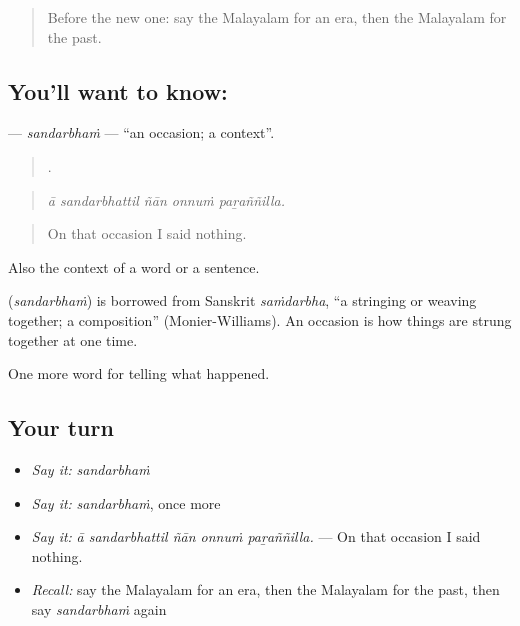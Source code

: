 \label{lesson:ML-C361-sandarbham}



\begin{quote}
Before the new one: say the Malayalam for an era, then the Malayalam for the past.
\end{quote}

\subsection*{You'll want to know: }
\textbf{} — \emph{sandarbhaṁ} — \textquotedblleft{}an occasion; a context\textquotedblright{}.

\begin{quote}
    .
\end{quote}

\begin{quote}
\emph{ā sandarbhattil ñān onnuṁ paṟaññilla.}
\end{quote}

\begin{quote}
On that occasion I said nothing.
\end{quote}

Also the context of a word or a sentence.

\begin{cousinweb}
\textbf{} (\emph{sandarbhaṁ}) is borrowed from Sanskrit \emph{saṁdarbha}, \textquotedblleft{}a stringing or weaving together; a composition\textquotedblright{} (Monier-Williams). An occasion is how things are strung together at one time.
\end{cousinweb}

\begin{grammarlens}[title={What you've built}]
One more word for telling what happened.
\end{grammarlens}

\subsection*{Your turn}
\begin{itemize}
\raggedright
  \item \emph{Say it:} \emph{sandarbhaṁ}
  \item \emph{Say it:} \emph{sandarbhaṁ}, once more
  \item \emph{Say it:} \emph{ā sandarbhattil ñān onnuṁ paṟaññilla.} — On that occasion I said nothing.
  \item \emph{Recall:} say the Malayalam for an era, then the Malayalam for the past, then say \emph{sandarbhaṁ} again
\end{itemize}

